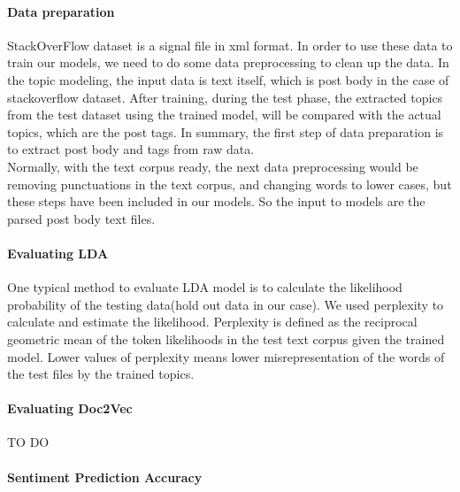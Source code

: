\paragraph{Data preparation} 
StackOverFlow dataset is a signal file in xml format. In order to use these data to train our models, we need to do some data preprocessing to clean up the data. In the topic modeling, the input data is text itself, which is post body in the case of stackoverflow dataset. After training, during the test phase, the extracted topics from the test dataset using the trained model, will be compared with the actual topics, which are the post tags. In summary, the first step of data preparation is to extract post body and tags from raw data.\\
Normally, with the text corpus ready, the next data preprocessing would be removing punctuations in the text corpus, and changing words to lower cases, but these steps have been included in our models. So the input to models are the parsed post body text files.
\paragraph{Evaluating LDA}
One typical method to evaluate LDA model is to calculate the likelihood probability of the testing data(hold out data in our case). We used perplexity to calculate and estimate the likelihood. Perplexity is defined as the reciprocal geometric mean of the token likelihoods in the test text corpus given the trained model. Lower values of perplexity means lower misrepresentation of the words of the test files by the trained topics. 

\paragraph{Evaluating Doc2Vec}
TO DO

\paragraph{Sentiment Prediction Accuracy}
%
%
%
%

